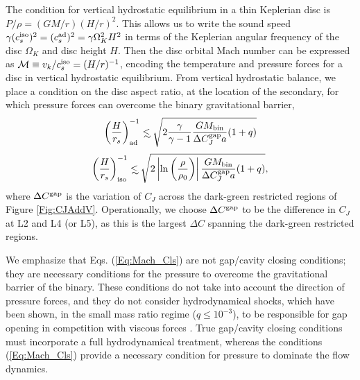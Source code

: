 \documentclass[usenatbib]{mnras}
\newcommand\lsim{\mathrel{\rlap{\lower4pt\hbox{\hskip1pt$\sim$}}
        \raise1pt\hbox{$<$}}}
\def\bin{\rm{bin}}
\begin{document}
The condition for vertical hydrostatic equilibrium in a thin Keplerian
disc is $P/\rho = (GM/r)(H/r)^2$. This allows us to write the sound
speed $\gamma(c^{\rm{iso}}_s)^2 = (c^{\rm{ad}}_s)^2 = \gamma
\Omega^2_K H^2$ in terms of the Keplerian angular frequency of the disc
$\Omega_K$ and disc height $H$. Then the disc orbital Mach number can
be expressed as $\mathcal{M} \equiv v_k/c^{\rm{iso}}_s =
(H/r)^{-1}$, encoding the temperature and pressure forces for a disc in vertical 
hydrostatic equilibrium. From vertical hydrostatic balance, we place a condition on the disc aspect ratio, at the location of the secondary, for which pressure forces can overcome the binary gravitational barrier, 
\[
\nonumber 
\left(\frac{H}{r_s} \right)^{-1}_{\rm{ad}}  \lsim  \sqrt{2 \frac{\gamma}{\gamma-1} \frac{GM_{\bin}}{ \Delta C^{\rm{gap}}_J  a} (1+q) } \nonumber 
\]
%
\begin{equation}
\left(\frac{H}{r_s} \right)^{-1}_{\rm{iso}}  \lsim  \sqrt{2 \left| \ln{\left( \frac{\rho}{\rho_0}\right)} \right| \frac{GM_{\bin}}{ \Delta C^{\rm{gap}}_J a} (1+q) },
\label{Eq:Mach_Cls}
\end{equation}
where $\Delta C^{\rm{gap}}$ is the variation of $C_J$ across the
dark-green restricted regions of Figure
\ref{Fig:CJAddV}. Operationally, we choose $\Delta C^{\rm{gap}}$ to be
the difference in $C_J$ at L2 and L4 (or L5), as this is the largest
$\Delta C$ spanning the dark-green restricted regions.

We emphasize that Eqs. (\ref{Eq:Mach_Cls}) are not gap/cavity closing conditions; 
they are necessary conditions for the pressure to overcome the gravitational barrier of the binary. These conditions do not take into account the direction of pressure forces, and they do not consider hydrodynamical shocks, which have been shown, in the small mass ratio regime ($q\leq 10^{-3}$), to be responsible for gap opening in competition with viscous forces \citep{DongRafI:2011, DongRafII:2011, DuffellMac:2013:smallqGapOpen, FungGaps:2014, DuffellGapAnyl:2015}. 
True gap/cavity closing conditions must incorporate a full hydrodynamical treatment, whereas the conditions (\ref{Eq:Mach_Cls}) provide a necessary condition for pressure to dominate the flow dynamics.
\end{document}
